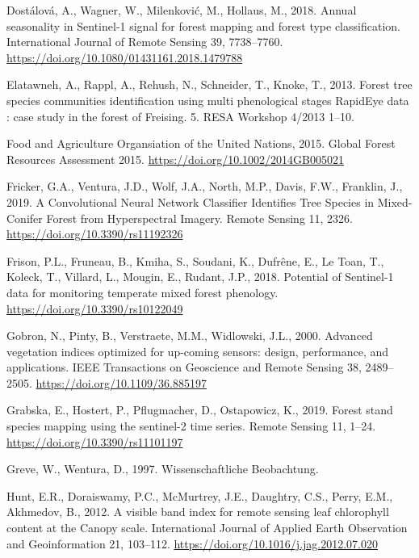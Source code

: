 \documentclass[]{article}
\begin{document}
\leavevmode\hypertarget{ref-Dostalova2018}{}%
Dostálová, A., Wagner, W., Milenković, M., Hollaus, M., 2018. Annual
seasonality in Sentinel-1 signal for forest mapping and forest type
classification. International Journal of Remote Sensing 39, 7738--7760.
\url{https://doi.org/10.1080/01431161.2018.1479788}

\leavevmode\hypertarget{ref-Elatawneh2013}{}%
Elatawneh, A., Rappl, A., Rehush, N., Schneider, T., Knoke, T., 2013.
Forest tree species communities identification using multi phenological
stages RapidEye data : case study in the forest of Freising. 5. RESA
Workshop 4/2013 1--10.

\leavevmode\hypertarget{ref-FoodandAgricultureOrgansiationoftheUnitedNations2015}{}%
Food and Agriculture Organsiation of the United Nations, 2015. Global
Forest Resources Assessment 2015.
\url{https://doi.org/10.1002/2014GB005021}

\leavevmode\hypertarget{ref-Fricker2019}{}%
Fricker, G.A., Ventura, J.D., Wolf, J.A., North, M.P., Davis, F.W.,
Franklin, J., 2019. A Convolutional Neural Network Classifier Identifies
Tree Species in Mixed-Conifer Forest from Hyperspectral Imagery. Remote
Sensing 11, 2326. \url{https://doi.org/10.3390/rs11192326}

\leavevmode\hypertarget{ref-Frison2018}{}%
Frison, P.L., Fruneau, B., Kmiha, S., Soudani, K., Dufrêne, E., Le Toan,
T., Koleck, T., Villard, L., Mougin, E., Rudant, J.P., 2018. Potential
of Sentinel-1 data for monitoring temperate mixed forest phenology.
\url{https://doi.org/10.3390/rs10122049}

\leavevmode\hypertarget{ref-Gobron2000}{}%
Gobron, N., Pinty, B., Verstraete, M.M., Widlowski, J.L., 2000. Advanced
vegetation indices optimized for up-coming sensors: design, performance,
and applications. IEEE Transactions on Geoscience and Remote Sensing 38,
2489--2505. \url{https://doi.org/10.1109/36.885197}

\leavevmode\hypertarget{ref-Grabska2019}{}%
Grabska, E., Hostert, P., Pflugmacher, D., Ostapowicz, K., 2019. Forest
stand species mapping using the sentinel-2 time series. Remote Sensing
11, 1--24. \url{https://doi.org/10.3390/rs11101197}

\leavevmode\hypertarget{ref-Greve1997}{}%
Greve, W., Wentura, D., 1997. Wissenschaftliche Beobachtung.

\leavevmode\hypertarget{ref-Hunt2012}{}%
Hunt, E.R., Doraiswamy, P.C., McMurtrey, J.E., Daughtry, C.S., Perry,
E.M., Akhmedov, B., 2012. A visible band index for remote sensing leaf
chlorophyll content at the Canopy scale. International Journal of
Applied Earth Observation and Geoinformation 21, 103--112.
\url{https://doi.org/10.1016/j.jag.2012.07.020}
\end{document}
